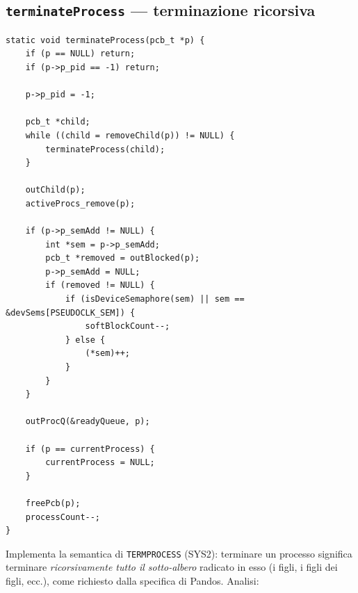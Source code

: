 \documentclass[11pt,a4paper]{article}
\newcommand{\code}[1]{\texttt{#1}}
\newcommand{\func}[1]{\textbf{\texttt{#1}}}
\begin{document}
\subsection{\func{terminateProcess} --- terminazione ricorsiva}
\begin{lstlisting}
static void terminateProcess(pcb_t *p) {
    if (p == NULL) return;
    if (p->p_pid == -1) return;

    p->p_pid = -1;

    pcb_t *child;
    while ((child = removeChild(p)) != NULL) {
        terminateProcess(child);
    }

    outChild(p);
    activeProcs_remove(p);

    if (p->p_semAdd != NULL) {
        int *sem = p->p_semAdd;
        pcb_t *removed = outBlocked(p);
        p->p_semAdd = NULL;
        if (removed != NULL) {
            if (isDeviceSemaphore(sem) || sem == &devSems[PSEUDOCLK_SEM]) {
                softBlockCount--;
            } else {
                (*sem)++;
            }
        }
    }

    outProcQ(&readyQueue, p);

    if (p == currentProcess) {
        currentProcess = NULL;
    }

    freePcb(p);
    processCount--;
}
\end{lstlisting}
Implementa la semantica di \code{TERMPROCESS} (SYS2): terminare un processo
significa terminare \emph{ricorsivamente tutto il sotto-albero} radicato in
esso (i figli, i figli dei figli, ecc.), come richiesto dalla specifica di
Pandos. Analisi:
\end{document}
